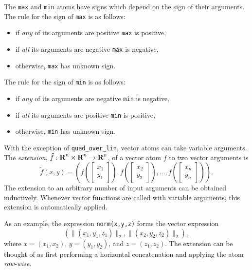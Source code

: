 \documentclass[11pt]{article}
\newcommand{\reals}{{\mbox{\bf R}}}
\begin{document}
The {\tt max} and {\tt min} atoms have signs which depend on the sign of their
arguments. The rule for the sign of {\tt max} is as follows:
\begin{itemize}
\item if \emph{any} of its arguments are positive {\tt max} is positive,
\item if \emph{all} its arguments are negative {\tt max} is negative,
\item otherwise, {\tt max} has unknown sign.
\end{itemize}
The rule for the sign of {\tt min} is as follows:
\begin{itemize}
\item if \emph{any} of its arguments are negative {\tt min} is negative,
\item if \emph{all} its arguments are positive {\tt min} is positive,
\item otherwise, {\tt min} has unknown sign.
\end{itemize}

With the exception of {\tt quad\_over\_lin}, vector atoms can take variable
arguments. The \emph{extension}, $\tilde f : \reals^n \times \reals^n \to
\reals^n$, of a vector atom $f$ to two vector arguments is
\[
\tilde f(x, y) = \left( f\left(\begin{bmatrix} x_1 \\ y_1 \end{bmatrix}\right),
  f\left(\begin{bmatrix}x_2 \\ y_2 \end{bmatrix}\right), \ldots,
  f\left(\begin{bmatrix}x_n \\ y_n\end{bmatrix}\right) \right).
\]
The extension to an arbitrary number of input arguments can be obtained inductively.
Whenever vector functions are called with variable arguments, this extension
is automatically applied.

As an example, the expression {\tt norm(x,y,z)} forms the vector expression
\[
\left(
  \|(x_1,y_1,z_1)\|_2,
  \|(x_2, y_2, z_2)\|_2
\right),
\]
where $x = (x_1,x_2)$, $y = (y_1, y_2)$, and $z = (z_1, z_2)$. The extension
can be thought of as first performing a horizontal concatenation and applying
the atom \emph{row-wise}.
\end{document}
